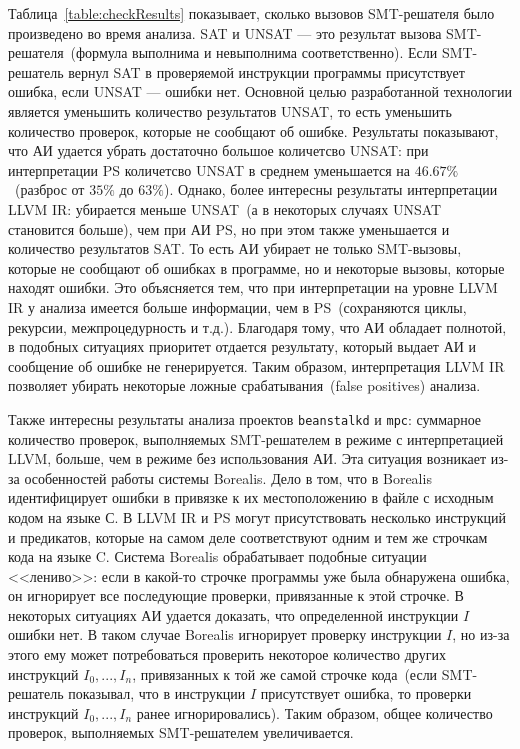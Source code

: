 Таблица~\ref{table:checkResults} показывает, сколько вызовов SMT-решателя было
произведено во время анализа. SAT и UNSAT --- это результат вызова 
SMT-решателя~(формула выполнима и невыполнима соответственно). Если SMT-решатель
вернул SAT в проверяемой инструкции программы присутствует ошибка, если 
UNSAT --- ошибки нет. Основной целью разработанной технологии является уменьшить
количество результатов UNSAT, то есть уменьшить количество проверок, которые не
сообщают об ошибке. Результаты показывают, что АИ удается убрать достаточно 
большое количетсво UNSAT: при интерпретации PS количетсво UNSAT в среднем 
уменьшается на $46.67\%$~(разброс от $35\%$ до $63\%$). Однако, более интересны 
результаты интерпретации LLVM IR: убирается меньше UNSAT~(а в некоторых
случаях UNSAT становится больше), чем при АИ PS, но при этом также уменьшается 
и количество результатов SAT. То есть АИ убирает не только SMT-вызовы, которые 
не сообщают об ошибках в программе, но и некоторые вызовы, которые находят 
ошибки. Это объясняется тем, что при интерпретации на уровне LLVM IR у анализа 
имеется больше информации, чем в PS~(сохраняются циклы, рекурсии, 
межпроцедурность и т.д.). Благодаря тому, что АИ обладает полнотой, в подобных
ситуациях приоритет отдается результату, который выдает АИ и сообщение об
ошибке не генерируется. Таким образом, интерпретация LLVM IR позволяет убирать
некоторые ложные срабатывания~(false positives) анализа.

Также интересны результаты анализа проектов \texttt{beanstalkd} и \texttt{mpc}:
суммарное количество проверок, выполняемых SMT-решателем в режиме с 
интерпретацией LLVM, больше, чем в режиме без использования АИ. Эта ситуация
возникает из-за особенностей работы системы Borealis. Дело в том, что в Borealis
идентифицирует ошибки в привязке к их местоположению в файле с исходным кодом на
языке С. В LLVM IR и PS могут присутствовать несколько инструкций и предикатов, 
которые на самом деле соответствуют одним и тем же строчкам кода на языке C.
Система Borealis обрабатывает подобные ситуации <<лениво>>: если в какой-то
строчке программы уже была обнаружена ошибка, он игнорирует все последующие 
проверки, привязанные к этой строчке. В некоторых ситуациях АИ удается доказать,
что определенной инструкции $I$ ошибки нет. В таком случае Borealis игнорирует
проверку инструкции $I$, но из-за этого ему может потребоваться проверить 
некоторое количество других инструкций $I_0, ..., I_n$, привязанных к той же 
самой строчке кода~(если SMT-решатель показывал, что в инструкции $I$ 
присутствует ошибка, то проверки инструкций $I_0, ..., I_n$ ранее 
игнорировались). Таким образом, общее количество проверок, выполняемых 
SMT-решателем увеличивается.

